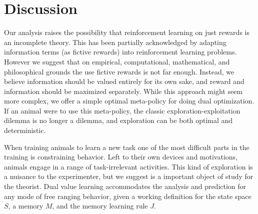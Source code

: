 \documentclass[9pt,twocolumn,twoside]{pnas-new}
\begin{document}




\section*{Discussion}
Our analysis raises the possibility that reinforcement learning on just rewards is an incomplete theory. This has been partially acknowledged by adapting information terms (as fictive rewards) into reinforcement learning problems. However we suggest that on empirical, computational, mathematical, and philosophical grounds the use fictive rewards is not far enough. Instead,  we believe information should be valued entirely for its own sake, and reward and information should be maximized separately. While this approach might seem more complex, we offer a simple optimal meta-policy for doing dual optimization. If an animal were to use this meta-policy, the classic exploration-exploitation dilemma is no longer a dilemma, and exploration can be both optimal and deterministic.

When training animals to learn a new task one of the most difficult parts in the training is constraining behavior. Left to their own devices and motivations, animals engage in a range of task-irrelevant activities. This kind of exploration is a nuisance to the experimenter, but we suggest is a important object of study for the theorist. Dual value learning accommodates the analysis and prediction for any mode of free ranging behavior, given a working definition for the state space $S$, a memory $M$, and the memory learning rule $J$.  %
\end{document}
